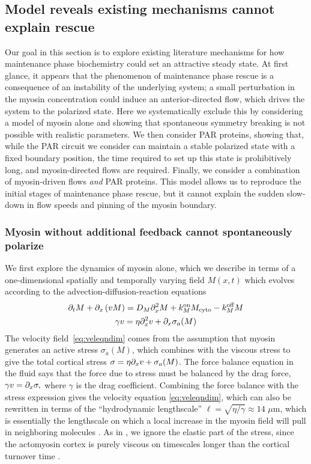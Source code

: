\documentclass[11pt]{article}
\newcommand{\6}[1]{#1_{\text{6}}}
\newcommand{\3}[1]{#1_{\text{3}}}
\newcommand{\My}[1]{#1_M}
\begin{document}
\subsection{Model reveals existing mechanisms cannot explain rescue }
Our goal in this section is to explore existing literature mechanisms for how maintenance phase biochemistry could set an attractive steady state. At first glance, it appears that the phenomenon of maintenance phase rescue is a consequence of an instability of the underlying system; a small perturbation in the myosin concentration could induce an anterior-directed flow, which drives the system to the polarized state. Here we systematically exclude this by considering a model of myosin alone and showing that spontaneous symmetry breaking is not possible with realistic parameters. We then consider PAR proteins, showing that, while the PAR circuit we consider can maintain a stable polarized state with a fixed boundary position, the time required to set up this state is prohibitively long, and myosin-directed flows are required. Finally, we consider a combination of myosin-driven flows \emph{and} PAR proteins. This model allows us to reproduce the initial stages of maintenance phase rescue, but it cannot explain the sudden slow-down in flow speeds and pinning of the myosin boundary.

\subsubsection{Myosin without additional feedback cannot spontaneously polarize \label{sec:myosin}}
We first explore the dynamics of myosin alone, which we describe in terms of a one-dimensional spatially and temporally varying field $M(x,t)$ which evolves according to the advection-diffusion-reaction equations \citep{bois2011pattern}
\begin{subequations}
\label{eq:MyOnly}
\begin{gather}
\Dt M + \Dx \left(v M\right) = D_M \Dx^2 M +\My{\kon}M_\text{cyto} - \My{\koff} M \\
\label{eq:veleqndim}
\gamma v = \eta \Dx^2 v + \Dx \sigma_a(M)
\end{gather}
\end{subequations}
The velocity field\ \eqref{eq:veleqndim} comes from the assumption that myosin generates an active stress $\sigma_a(M)$, which combines with the viscous stress to give the total cortical stress $\sigma = \eta \partial_x{v} + \sigma_a(M)$. The force balance equation in the fluid says that the force due to stress must be balanced by the drag force, $\gamma v = \partial_x \sigma,$
where $\gamma$ is the drag coefficient. Combining the force balance with the stress expression gives the velocity equation \eqref{eq:veleqndim}, which can also be rewritten in terms of the ``hydrodynamic lengthscale'' $\ell=\sqrt{\eta/\gamma} \approx 14$ $\mu$m, which is essentially the lengthscale on which a local increase in the myosin field will pull in neighboring molecules  \citep{mayer2010anisotropies}. As in \citep{bois2011pattern}, we ignore the elastic part of the stress, since the actomyosin cortex is purely viscous on timescales longer than the cortical turnover time \citep{mayer2010anisotropies}. 
\end{document}
